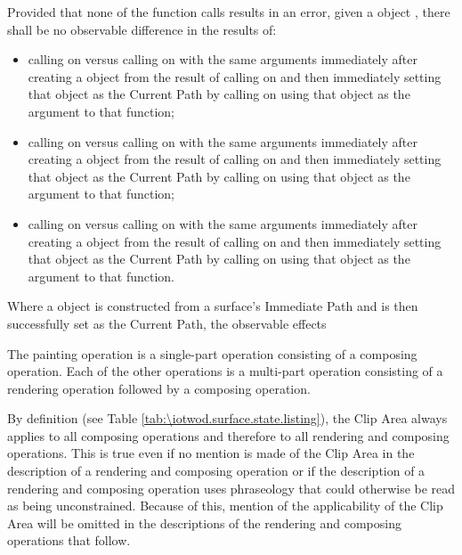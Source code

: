\pnum
Provided that none of the function calls results in an error, given a  object , there shall be no observable difference in the results of:
\begin{itemize}
	\item calling  on  versus calling  on  with the same arguments immediately after creating a  object from the result of calling  on  and then immediately setting that  object as the Current Path by calling  on  using that  object as the argument to that function;
	\item calling  on  versus calling  on  with the same arguments immediately after creating a  object from the result of calling  on  and then immediately setting that  object as the Current Path by calling  on  using that  object as the argument to that function;
	\item calling  on  versus calling  on  with the same arguments immediately after creating a  object from the result of calling  on  and then immediately setting that  object as the Current Path by calling  on  using that  object as the argument to that function.
\end{itemize}

\pnum
Where a  object is constructed from a surface's Immediate Path and is then successfully set as the Current Path, the observable effects

\pnum
The painting operation is a single-part operation consisting of a composing operation. Each of the other operations is a multi-part operation consisting of a rendering operation followed by a composing operation.

\pnum
\enternote
By definition (see Table \ref{tab:\iotwod.surface.state.listing}), the Clip Area always applies to all composing operations and therefore to all rendering and composing operations. This is true even if no mention is made of the Clip Area in the description of a rendering and composing operation or if the description of a rendering and composing operation uses phraseology that could otherwise be read as being unconstrained. Because of this, mention of the applicability of the Clip Area will be omitted in the descriptions of the rendering and composing operations that follow.
\exitnote


